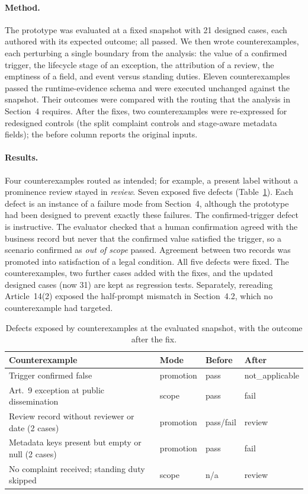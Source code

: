 \documentclass[sigconf,review,anonymous]{acmart}
\begin{document}
\paragraph{Method.} The prototype was evaluated at a fixed snapshot with 21 designed cases, each authored with its expected outcome; all passed. We then wrote counterexamples, each perturbing a single boundary from the analysis: the value of a confirmed trigger, the lifecycle stage of an exception, the attribution of a review, the emptiness of a field, and event versus standing duties. Eleven counterexamples passed the runtime-evidence schema and were executed unchanged against the snapshot. Their outcomes were compared with the routing that the analysis in Section~4 requires. After the fixes, two counterexamples were re-expressed for redesigned controls (the split complaint controls and stage-aware metadata fields); the before column reports the original inputs.

\paragraph{Results.} Four counterexamples routed as intended; for example, a present label without a prominence review stayed in \emph{review}. Seven exposed five defects (Table~\ref{tab:defects}). Each defect is an instance of a failure mode from Section~4, although the prototype had been designed to prevent exactly these failures. The confirmed-trigger defect is instructive. The evaluator checked that a human confirmation agreed with the business record but never that the confirmed value satisfied the trigger, so a scenario confirmed as \emph{out of scope} passed. Agreement between two records was promoted into satisfaction of a legal condition. All five defects were fixed. The counterexamples, two further cases added with the fixes, and the updated designed cases (now 31) are kept as regression tests. Separately, rereading Article~14(2) exposed the half-prompt mismatch in Section~4.2, which no counterexample had targeted.

\begin{table}[t]
\caption{Defects exposed by counterexamples at the evaluated snapshot, with the outcome after the fix.}
\label{tab:defects}
\small
\begin{tabular}{@{}p{3.25cm}p{0.9cm}p{1.1cm}p{1.3cm}@{}}
\toprule
Counterexample & Mode & Before & After \\
\midrule
Trigger confirmed false & promotion & pass & not\_applicable \\
Art.~9 exception at public dissemination & scope & pass & fail \\
Review record without reviewer or date (2 cases) & promotion & pass/fail & review \\
Metadata keys present but empty or null (2 cases) & promotion & pass & fail \\
No complaint received; standing duty skipped & scope & n/a & review \\
\bottomrule
\end{tabular}
\end{table}
\end{document}
